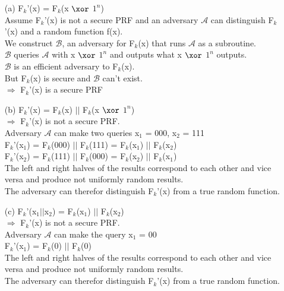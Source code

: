 \begin{itemize}
\item[(a)]
	F\(_{k}\)'(x) = F\(_{k}\)(x  \(\xor\)  \(1^{n}\)) \\
	Assume F\(_{k}\)'(x) is not a secure PRF and an adversary \(\mathcal{A}\) can distinguish F\(_{k}\)'(x) and a random function f(x).\\
	We construct \(\mathcal{B}\), an adversary for F\(_{k}\)(x) that runs \(\mathcal{A}\) as a subroutine.\\
	\(\mathcal{B}\) queries \(\mathcal{A}\) with x  \(\xor\)  \(1^{n}\) and outputs what x  \(\xor\)  \(1^{n}\) outputs.\\
	\(\mathcal{B}\) is an efficient adversary to  F\(_{k}\)(x).\\
	But  F\(_{k}\)(x) is secure and \(\mathcal{B}\)  can't exist. \\
	\(\Rightarrow\) F\(_{k}\)'(x) is a secure PRF \\

\item[(b)]
	F\(_{k}\)'(x) =  F\(_{k}\)(x) \(\vert \vert\) F\(_{k}\)(x  \(\xor\)  \(1^{n}\)) \\
	\(\Rightarrow\) F\(_{k}\)'(x) is not a secure PRF.\\
	Adversary \(\mathcal{A}\) can make two queries x\(_{1}\) = 000, x\(_{2}\) = 111 \\
	F\(_{k}\)'(x\(_{1}\)) = F\(_{k}\)(000)  \(\vert \vert\) F\(_{k}\)(111) = F\(_{k}\)(x\(_{1}\))  \(\vert \vert\) F\(_{k}\)(x\(_{2}\)) \\
	F\(_{k}\)'(x\(_{2}\)) = F\(_{k}\)(111)  \(\vert \vert\) F\(_{k}\)(000) = F\(_{k}\)(x\(_{2}\))  \(\vert \vert\) F\(_{k}\)(x\(_{1}\)) \\
	The left and right halves of the results correspond to each other and vice versa and produce not uniformly random results.\\
	The adversary can therefor distinguish F\(_{k}\)'(x) from a true random function.\\
	
\item[(c)]
	F\(_{k}\)'(x\(_{1}\)\(\vert \vert\)x\(_{2}\)) =  F\(_{k}\)(x\(_{1}\)) \(\vert \vert\) F\(_{k}\)(x\(_{2}\)) \\
	\(\Rightarrow\) F\(_{k}\)'(x) is not a secure PRF.\\
	Adversary \(\mathcal{A}\) can make the query x\(_{1}\) = 00 \\
	F\(_{k}\)'(x\(_{1}\)) =  F\(_{k}\)(0) \(\vert \vert\) F\(_{k}\)(0) \\
	The left and right halves of the results correspond to each other and vice versa and produce not uniformly random results.\\
	The adversary can therefor distinguish F\(_{k}\)'(x) from a true random function.\\


\end{itemize}
